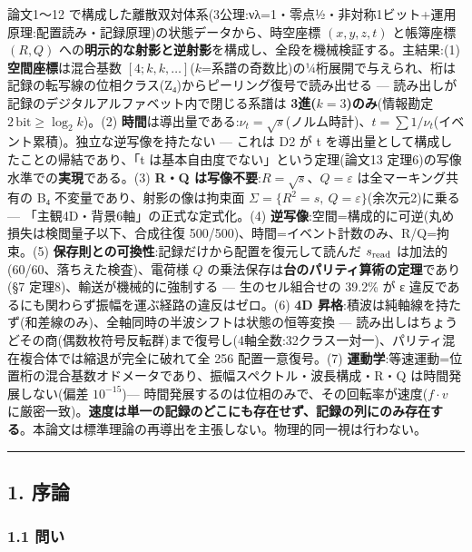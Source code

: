 \documentclass[
]{ltjsarticle}
\begin{document}
論文1〜12
で構成した離散双対体系(3公理:νλ=1・零点½・非対称1ビット+運用原理:配置読み・記録原理)の状態データから、時空座標
\((x,y,z,t)\) と帳簿座標 \((R,Q)\)
への\textbf{明示的な射影と逆射影}を構成し、全段を機械検証する。主結果:(1)
\textbf{空間座標}は混合基数
\([4;k,k,\dots]\)(\(k\)=系譜の奇数比)の¼桁展開で与えられ、桁は記録の転写線の位相クラス(Z₄)からピーリング復号で読み出せる
--- 読み出しが記録のデジタルアルファベット内で閉じる系譜は
\textbf{3進(\(k{=}3\))のみ}(情報勘定
\(2\,\mathrm{bit}\ge\log_2 k\))。(2)
\textbf{時間}は導出量である:\(\nu_t=\sqrt{s}\)(ノルム時計)、\(t=\sum 1/\nu_t\)(イベント累積)。独立な逆写像を持たない
--- これは D2 が t を導出量として構成したことの帰結であり、「t
は基本自由度でない」という定理(論文13
定理6)の写像水準での\textbf{実現}である。(3) \textbf{R・Q
は写像不要}:\(R=\sqrt{s}\)、\(Q=\varepsilon\) は全マーキング共有の B₄
不変量であり、射影の像は拘束面
\(\Sigma=\{R^2=s,\ Q=\varepsilon\}\)(余次元2)に乗る ---
「主観4D・背景6軸」の正式な定式化。(4)
\textbf{逆写像}:空間=構成的に可逆(丸め損失は検閲量子以下、合成往復
500/500)、時間=イベント計数のみ、R/Q=拘束。(5)
\textbf{保存則との可換性}:記録だけから配置を復元して読んだ
\(s_{\rm read}\) は加法的(60/60、落ちえた検査)、電荷様 \(Q\)
の乗法保存は\textbf{台のパリティ算術の定理}であり(§7
定理8)、輸送が機械的に強制する --- 生のセル組合せの 39.2\% が ε
違反であるにも関わらず振幅を運ぶ経路の違反はゼロ。(6) \textbf{4D
昇格}:積波は純軸線を持たず(和差線のみ)、全軸同時の半波シフトは状態の恒等変換
---
読み出しはちょうどその商(偶数枚符号反転群)まで復号し(4軸全数:32クラス一対一)、パリティ混在複合体では縮退が完全に破れて全
256 配置一意復号。(7)
\textbf{運動学}:等速運動=位置桁の混合基数オドメータであり、振幅スペクトル・波長構成・R・Q
は時間発展しない(偏差 \(10^{-15}\))---
時間発展するのは位相のみで、その回転率が速度(\(f\cdot v\)
に厳密一致)。\textbf{速度は単一の記録のどこにも存在せず、記録の列にのみ存在する}。本論文は標準理論の再導出を主張しない。物理的同一視は行わない。

\begin{center}\rule{0.5\linewidth}{0.5pt}\end{center}

\subsection{1. 序論}\label{ux5e8fux8ad6}

\subsubsection{1.1 問い}\label{ux554fux3044}
\end{document}
